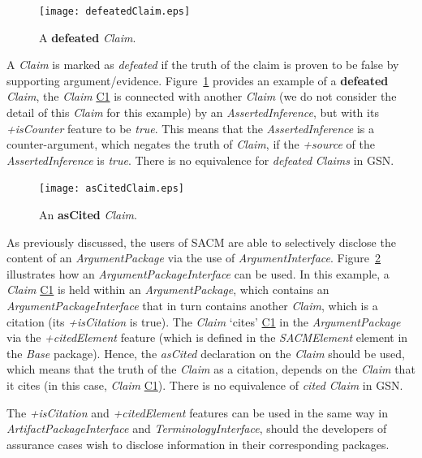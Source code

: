 \begin{figure}
	\centering
	\texttt{[image: defeatedClaim.eps]}
	\caption{A \textbf{defeated} \textit{Claim}.}
	\label{fig:defeatedClaim}
\end{figure}
A \textit{Claim} is marked as \textit{defeated} if the truth of the claim is proven to be false by supporting argument/evidence. 
Figure~\ref{fig:defeatedClaim} provides an example of a \textbf{defeated} \textit{Claim}, the \textit{Claim} \underline{C1} is connected with another \textit{Claim} (we do not consider the detail of this \textit{Claim} for this example) by an \textit{AssertedInference}, but with its \textit{+isCounter} feature to be \textit{true}. 
This means that the \textit{AssertedInference} is a counter-argument, which negates the truth of \textit{Claim}, if the \textit{+source} of the \textit{AssertedInference} is \textit{true}.
There is no equivalence for \textit{defeated} \textit{Claims} in GSN.

\begin{figure}[ht!]
	\centering
	\texttt{[image: asCitedClaim.eps]}
	\caption{An \textbf{asCited} \textit{Claim}.}
	\label{fig:asCited}
\end{figure}

As previously discussed, the users of SACM are able to selectively disclose the content of an \textit{ArgumentPackage} via the use of \textit{ArgumentInterface}. 
Figure~\ref{fig:asCited} illustrates how an \textit{ArgumentPackageInterface} can be used. 
In this example, a \textit{Claim} \underline{C1} is held within an \textit{ArgumentPackage}, which contains an \textit{ArgumentPackageInterface} that in turn contains another \textit{Claim}, which is a citation (its \textit{+isCitation} is true). 
The \textit{Claim} `cites' \underline{C1} in the \textit{ArgumentPackage} via the \textit{+citedElement} feature (which is defined in the \textit{SACMElement} element in the \textit{Base} package). 
Hence, the \textit{asCited} declaration on the \textit{Claim} should be used, which means that the truth of the \textit{Claim} as a citation, depends on the \textit{Claim} that it cites (in this case, \textit{Claim} \underline{C1}).
There is no equivalence of \textit{cited} \textit{Claim} in GSN.

The \textit{+isCitation} and \textit{+citedElement} features can be used in the same way in \textit{ArtifactPackageInterface} and \textit{TerminologyInterface}, should the developers of assurance cases wish to disclose information in their corresponding packages.

